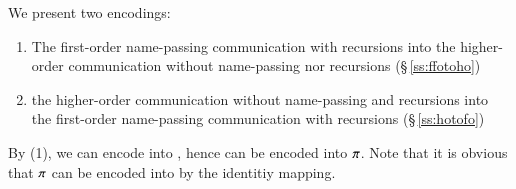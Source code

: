 We present two encodings:
\begin{enumerate}
\item The first-order name-passing communication with recursions into 
the higher-order communication without name-passing nor 
recursions (\S\,\ref{ss:ffotoho})
\item the higher-order communication without 
name-passing and recursions into the first-order name-passing communication
with recursions (\S\,\ref{ss:hotofo})
\end{enumerate}
By (1), we can encode \HOp into \HO, hence \HOp can be encoded into 
$\pi$. Note that it is obvious that $\pi$ can be encoded into \HOp
by the identitiy mapping. 


